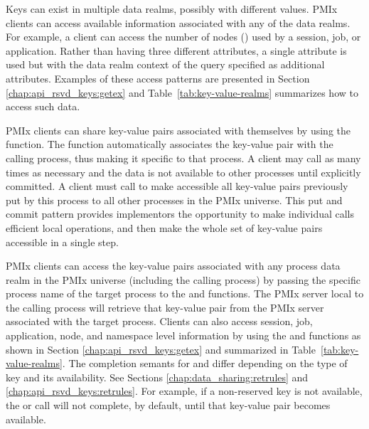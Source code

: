 Keys can exist in multiple data realms, possibly with different values. 
\ac{PMIx} clients can access available information associated with any of the data realms.
For example, a client can access the number of nodes () used by a 
session, job, or application.
Rather than having three different attributes, a single attribute is used but with the 
data realm context of the query specified as additional attributes.
Examples of these access patterns are presented in Section \ref{chap:api_rsvd_keys:getex} and 
Table~\ref{tab:key-value-realms} summarizes how to access such data.

\ac{PMIx} clients can share key-value pairs associated with themselves by using the  function.
The  function automatically associates the key-value pair with the calling process, thus making it specific to that process.
A client may call  as many times as necessary and the data is not available to other processes until explicitly committed.
A client must call  to make accessible all key-value pairs previously put by this process to all other processes in the \ac{PMIx} universe.
This put and commit pattern provides implementors the opportunity to make individual  calls efficient local operations, and then make the whole set of key-value pairs accessible in a single step.

\ac{PMIx} clients can access the key-value pairs associated with any process data realm 
in the \ac{PMIx} universe (including the calling process) by passing the specific process 
name of the target process to the  and  functions.
The \ac{PMIx} server local to the calling process will retrieve that key-value pair from 
the \ac{PMIx} server associated with the target process.
Clients can also access session, job, application, node, and namespace level information 
by using the  and  functions as shown in Section 
\ref{chap:api_rsvd_keys:getex} and summarized in Table~\ref{tab:key-value-realms}.
The completion semants for  and  differ 
depending on the type of key and its availability.  See Sections 
\ref{chap:data_sharing:retrules} and \ref{chap:api_rsvd_keys:retrules}.
For example, if a non-reserved key is not available, the  or  call 
will not complete, by default, until that key-value pair becomes available.

